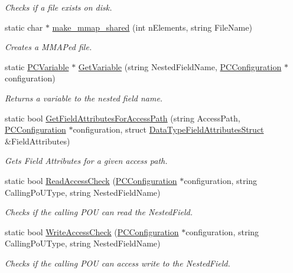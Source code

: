 \begin{DoxyCompactItemize}
\begin{DoxyCompactList}\small\item\em Checks if a file exists on disk. \end{DoxyCompactList}\item 
static char $\ast$ \hyperlink{classpc__emulator_1_1Utils_a12d34b0757d3945a292bf656af1873ab}{make\+\_\+mmap\+\_\+shared} (int n\+Elements, string File\+Name)
\begin{DoxyCompactList}\small\item\em Creates a M\+M\+AP\textquotesingle{}ed file. \end{DoxyCompactList}\item 
static \hyperlink{classpc__emulator_1_1PCVariable}{P\+C\+Variable} $\ast$ \hyperlink{classpc__emulator_1_1Utils_ab00462ed213e71aca03c52abf4e06503}{Get\+Variable} (string Nested\+Field\+Name, \hyperlink{classpc__emulator_1_1PCConfiguration}{P\+C\+Configuration} $\ast$configuration)
\begin{DoxyCompactList}\small\item\em Returns a variable to the nested field name. \end{DoxyCompactList}\item 
static bool \hyperlink{classpc__emulator_1_1Utils_aed87633e02fc22491260d495013c56df}{Get\+Field\+Attributes\+For\+Access\+Path} (string Access\+Path, \hyperlink{classpc__emulator_1_1PCConfiguration}{P\+C\+Configuration} $\ast$configuration, struct \hyperlink{structpc__emulator_1_1DataTypeFieldAttributesStruct}{Data\+Type\+Field\+Attributes\+Struct} \&Field\+Attributes)
\begin{DoxyCompactList}\small\item\em Gets Field Attributes for a given access path. \end{DoxyCompactList}\item 
static bool \hyperlink{classpc__emulator_1_1Utils_a22194d5b8d1dadf8fd795b6a75595fe6}{Read\+Access\+Check} (\hyperlink{classpc__emulator_1_1PCConfiguration}{P\+C\+Configuration} $\ast$configuration, string Calling\+Po\+U\+Type, string Nested\+Field\+Name)
\begin{DoxyCompactList}\small\item\em Checks if the calling P\+OU can read the Nested\+Field. \end{DoxyCompactList}\item 
static bool \hyperlink{classpc__emulator_1_1Utils_a7060cb4142919527d5719f2c1c933f4b}{Write\+Access\+Check} (\hyperlink{classpc__emulator_1_1PCConfiguration}{P\+C\+Configuration} $\ast$configuration, string Calling\+Po\+U\+Type, string Nested\+Field\+Name)
\begin{DoxyCompactList}\small\item\em Checks if the calling P\+OU can access write to the Nested\+Field. \end{DoxyCompactList}\end{DoxyCompactItemize}


